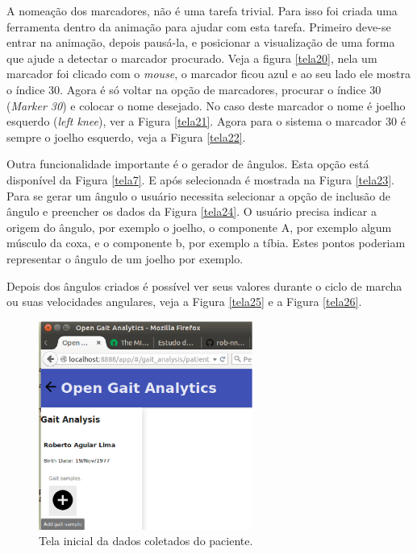 A nomeação dos marcadores, não é uma tarefa trivial. Para isso foi criada uma ferramenta dentro da animação para ajudar com esta tarefa. Primeiro deve-se entrar na animação, depois pausá-la, e posicionar a visualização de uma forma que ajude a detectar o marcador procurado. Veja a figura \ref{tela20}, nela um marcador foi clicado com o \emph{mouse}, o marcador ficou azul e ao seu lado ele mostra o índice 30. 
Agora é só voltar na opção de marcadores, procurar o índice 30 (\emph{Marker 30}) e colocar o nome desejado. No caso deste marcador o nome é joelho esquerdo (\emph{left knee}), ver a Figura \ref{tela21}.
Agora para o sistema o marcador 30 é sempre o joelho esquerdo, veja a Figura \ref{tela22}.

Outra funcionalidade importante é o gerador de ângulos. Esta opção está disponível da Figura \ref{tela7}. E após selecionada é mostrada na Figura \ref{tela23}. 
Para se gerar um ângulo o usuário necessita selecionar a opção de inclusão de ângulo e preencher os dados da Figura \ref{tela24}. O usuário precisa indicar a origem do ângulo, por exemplo o joelho, o componente A, por exemplo algum músculo da coxa, e o componente b, por exemplo a tíbia. Estes pontos poderiam representar o ângulo de um joelho por exemplo.

Depois dos ângulos criados é possível ver seus valores durante o ciclo de marcha ou suas velocidades angulares, veja a Figura \ref{tela25} e a Figura \ref{tela26}.

\begin{figure}[ht]
	\centering
	\includegraphics[width=7cm]{figuras/tela4.eps}
	\caption{Tela inicial da dados coletados do paciente.}
	\label{tela4}
\end{figure}


